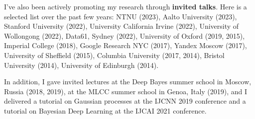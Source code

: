 \documentclass[oneside, a4paper, onecolumn, 10pt]{article}
\begin{document}
I've also been actively promoting my research through {\bf invited talks}. 
Here is a selected list over the past few years:
NTNU (2023), Aalto University (2023), Stanford University (2022), University California Irvine (2022), University of Wollongong (2022), Data61, Sydney (2022), University of Oxford (2019, 2015), Imperial College (2018), Google Research NYC (2017), Yandex Moscow (2017), University of Sheffield (2015), Columbia University (2017, 2014), Bristol University (2014), University of Edinburgh (2014). %

In addition, I gave invited lectures at the Deep Bayes summer school in Moscow, Russia (2018, 2019), at the MLCC summer school in Genoa, Italy (2019),
and I delivered a tutorial on Gaussian processes at the IJCNN 2019 conference and a tutorial on Bayesian Deep Learning at the IJCAI 2021 conference. 




\end{document}
